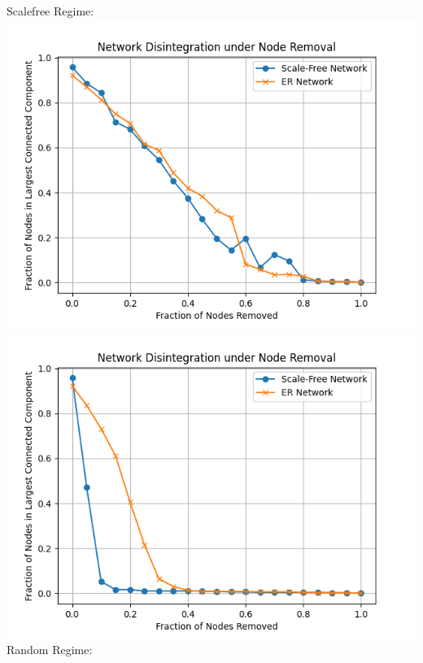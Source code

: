 \documentclass[11pt]{article}
\begin{document}
Scalefree Regime:\\
\includegraphics[scale=0.5]{rnrsf.png} \includegraphics[scale=0.5]{tnrsf.png}\\
Random Regime:\\
\end{document}
